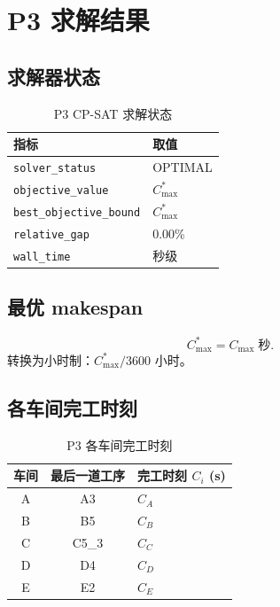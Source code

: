 \documentclass[UTF8,a4paper,12pt]{ctexart}
\begin{document}
\section{P3 求解结果}
\subsection{求解器状态}
\begin{table}[htbp]
  \centering
  \caption{P3 CP-SAT 求解状态}
  \label{tab:p3_solver_status}
  \begin{tabular}{ll}
    \toprule
    指标 & 取值 \\
    \midrule
    \texttt{solver\_status} & OPTIMAL \\
    \texttt{objective\_value} & $C_{\max}^*$ \\
    \texttt{best\_objective\_bound} & $C_{\max}^*$ \\
    \texttt{relative\_gap} & 0.00\% \\
    \texttt{wall\_time} & 秒级 \\
    \bottomrule
  \end{tabular}
\end{table}

\subsection{最优 makespan}
\begin{equation}
C_{\max}^* = C_{\max} \; \text{秒}. \tag{9-7}
\end{equation}
转换为小时制：$C_{\max}^* / 3600$ 小时。

\subsection{各车间完工时刻}
\begin{table}[htbp]
  \centering
  \caption{P3 各车间完工时刻}
  \label{tab:p3_completion}
  \begin{tabular}{ccl}
    \toprule
    车间 & 最后一道工序 & 完工时刻 $C_i$ (s) \\
    \midrule
    A & A3 & $C_A$ \\
    B & B5 & $C_B$ \\
    C & C5\_3 & $C_C$ \\
    D & D4 & $C_D$ \\
    E & E2 & $C_E$ \\
    \bottomrule
  \end{tabular}
\end{table}
\end{document}

